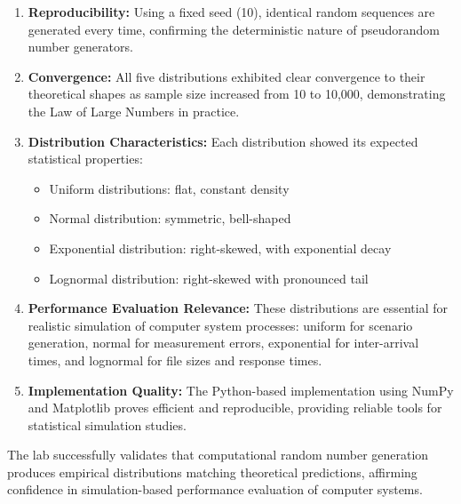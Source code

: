 \documentclass[12pt]{article}
\begin{document}
\begin{enumerate}
    \item \textbf{Reproducibility:} Using a fixed seed (10), identical random sequences are generated every time, confirming the deterministic nature of pseudorandom number generators.
    
    \item \textbf{Convergence:} All five distributions exhibited clear convergence to their theoretical shapes as sample size increased from 10 to 10,000, demonstrating the Law of Large Numbers in practice.
    
    \item \textbf{Distribution Characteristics:} Each distribution showed its expected statistical properties:
    \begin{itemize}
        \item Uniform distributions: flat, constant density
        \item Normal distribution: symmetric, bell-shaped
        \item Exponential distribution: right-skewed, with exponential decay
        \item Lognormal distribution: right-skewed with pronounced tail
    \end{itemize}
    
    \item \textbf{Performance Evaluation Relevance:} These distributions are essential for realistic simulation of computer system processes: uniform for scenario generation, normal for measurement errors, exponential for inter-arrival times, and lognormal for file sizes and response times.
    
    \item \textbf{Implementation Quality:} The Python-based implementation using NumPy and Matplotlib proves efficient and reproducible, providing reliable tools for statistical simulation studies.
\end{enumerate}

The lab successfully validates that computational random number generation produces empirical distributions matching theoretical predictions, affirming confidence in simulation-based performance evaluation of computer systems.
\end{document}
